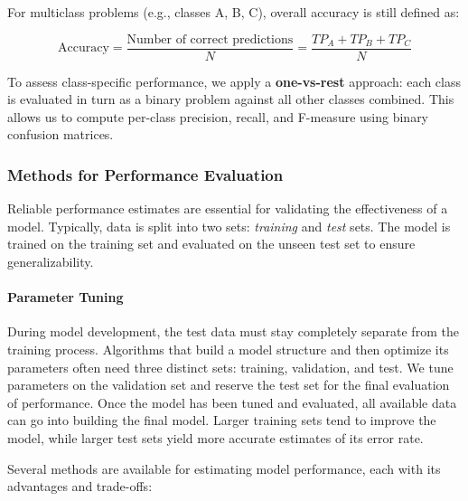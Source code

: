 For multiclass problems (e.g., classes A, B, C), overall accuracy is still defined as:

\begin{equation}
\text{Accuracy} = \frac{\text{Number of correct predictions}}{N} = \frac{TP_A + TP_B + TP_C}{N}
\end{equation}

To assess class-specific performance, we apply a \textbf{one-vs-rest} approach: each class is evaluated in turn as a binary problem against all other classes combined. This allows us to compute per-class precision, recall, and F-measure using binary confusion matrices.

\subsubsection{Methods for Performance Evaluation}
Reliable performance estimates are essential for validating the effectiveness of a model. Typically, data is split into two sets: \textit{training} and \textit{test} sets. The model is trained on the training set and evaluated on the unseen test set to ensure generalizability.

\paragraph{Parameter Tuning}
During model development, the test data must stay completely separate from the training process. Algorithms that build a model structure and then optimize its parameters often need three distinct sets: training, validation, and test. We tune parameters on the validation set and reserve the test set for the final evaluation of performance. Once the model has been tuned and evaluated, all available data can go into building the final model. Larger training sets tend to improve the model, while larger test sets yield more accurate estimates of its error rate.


Several methods are available for estimating model performance, each with its advantages and trade-offs:

